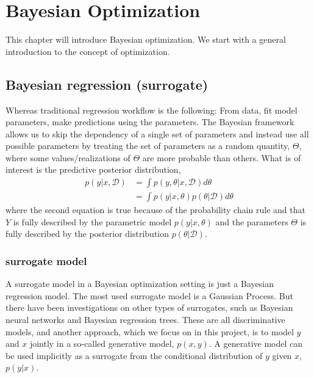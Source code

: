 \chapter{Bayesian Optimization}
This chapter will introduce Bayesian optimization. We start with a general introduction to 
the concept of optimization. 






\section{Bayesian regression (surrogate)}

Whereas traditional regression workflow is the following: From data, fit model parameters, make
predictions using the parameters. The Bayesian framework allows us to skip the dependency of a
single set of parameters and instead use all possible parameters by treating the set of parameters
as a random quantity, $\Theta$, where some values/realizations of $\Theta$ are more probable than
others. What is of interest is the predictive posterior distribution,  
\begin{align}\label{Predictive2}
    p(y|x, \mathcal{D}) &= \int p(y,\theta|x, \mathcal{D}) d\theta\\
    &= \int p(y|x,\theta)p(\theta|\mathcal{D}) d\theta
\end{align}
where the second equation is true because of the probability chain rule and that $Y$ is fully
described by the parametric model $p(y|x,\theta)$ and the parameters $\Theta$ is fully described by
the posterior distribution $p(\theta|\mathcal{D})$.

\subsection{surrogate model}
A surrogate model in a Bayesian optimization setting is just a Bayesian regression model. The most
used surrogate model is a Gaussian Process. But there have been investigations on other types of
surrogates, such as Bayesian neural networks and Bayesian regression trees. These are all
discriminative models, and another approach, which we focus on in this project, is to model $y$ and
$x$ jointly in a so-called generative model, $p(x,y)$. A generative model can be used implicitly
as a surrogate from the conditional distribution of $y$ given $x$, $p(y|x)$.

